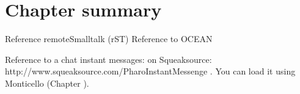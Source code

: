 \documentclass[a4paper,10pt,twoside]{book}
\begin{document}
%
%
%
%
%
%
%
%
%
%
%
%
%

\section{Chapter summary}
Reference remoteSmalltalk (rST)
Reference to OCEAN

Reference to a chat instant messages:  on Squeaksource: http://www.squeaksource.com/PharoInstantMessenge . You can load it using Monticello (Chapter ).

\ifx\wholebook\relax\else
\end{document}
